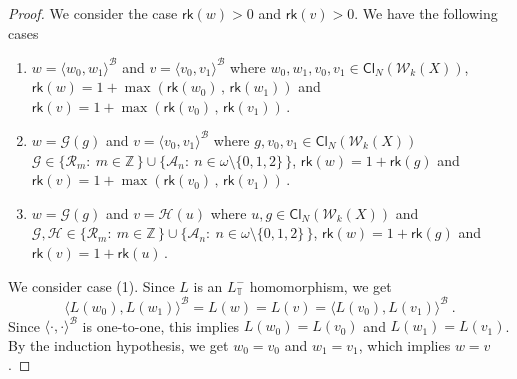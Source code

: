 \documentclass[10pt,a4paper]{amsart}
\begin{document}
\begin{proof}
We consider the case    $   \mathsf{rk}  \left( w  \right)    > 0  $  and     $    \mathsf{rk}  \left( v  \right)    >  0  $. 
We    have the following cases
\begin{enumerate}
\item    $  w  =  \langle  w_0 ,  w_1  \rangle^{  \mathcal{B}  }  $  and  $  v =  \langle  v_0, v_1  \rangle^{  \mathcal{B}  }  $
where  $ w_0, w_1,  v_0, v_1  \in     \mathsf{Cl}_{N}  \left(  \mathcal{W}_{k}  \left( X  \right)   \right)     $, 
 $  \mathsf{rk} \left(  w  \right)  =  1  +  \max\left(   \mathsf{rk} \left(  w_0 \right)  \,  ,  \,    \mathsf{rk} \left(  w_1  \right)   \right)     $ 
and  $  \mathsf{rk} \left(  v  \right)  =  1  +  \max\left(   \mathsf{rk} \left(  v_0 \right)  \,  ,  \,    \mathsf{rk} \left(  v_1  \right)   \right)    \,   $. 
  



\item     $  w  =    \mathcal{G}  \left(  g  \right)  $  and  $  v =  \langle v_0, v_1  \rangle^{  \mathcal{B}  }  $
where  $ g,  v_0, v_1  \in     \mathsf{Cl}_{N}  \left(  \mathcal{W}_{k}  \left( X  \right)   \right)     $
  $  \mathcal{G}     \in  \lbrace  \mathcal{R}_m   :  \   m  \in  \mathbb{Z} \,   \rbrace   \cup 
 \lbrace  \mathcal{A}_n :  \   n  \in    \omega  \setminus \lbrace 0, 1 ,  2   \rbrace  \,   \rbrace      $, 
  $  \mathsf{rk} \left(  w  \right)  =  1  +  \mathsf{rk} \left(  g \right)    $
and  $  \mathsf{rk} \left(  v  \right)  =  1  +  \max\left(   \mathsf{rk} \left(  v_0 \right)  \,  ,  \,    \mathsf{rk} \left(  v_1  \right)   \right)    \,   $. 



\item   $  w  =    \mathcal{G}  \left(  g   \right)  $  and  $  v =  \mathcal{H}  \left(  u \right)   $
where  $ u,  g  \in     \mathsf{Cl}_{N}  \left(  \mathcal{W}_{k}  \left( X  \right)   \right)     $
and  $  \mathcal{G} ,   \mathcal{H}      \in  \lbrace  \mathcal{R}_m   :  \   m  \in  \mathbb{Z} \,   \rbrace   \cup 
 \lbrace  \mathcal{A}_n :  \   n  \in    \omega  \setminus \lbrace 0, 1 ,  2    \rbrace  \,   \rbrace      $, 
   $  \mathsf{rk} \left(  w  \right)  =  1  +  \mathsf{rk} \left(  g \right)    $
and    $  \mathsf{rk} \left(  v  \right)  =  1  +  \mathsf{rk} \left(  u \right)       \,   $.
\end{enumerate} 
 We consider case (1). 
Since  $  L $  is an $  L_{  \mathbb{T} }^-  $  homomorphism,  we get  
\[
 \langle  L(w_0) ,  L( w_1)  \rangle^{  \mathcal{B}  }  
 =   L(w)   =  L(v)   =  
  \langle  L(v_0) ,  L( v_1)  \rangle^{  \mathcal{B}  }  
\     .
\]
Since  $  \langle  \cdot  ,  \cdot   \rangle^{  \mathcal{B}  }   $  is one-to-one,  
this implies  $  L(w_0) = L(v_0) $  and  $  L(w_1) = L(v_1) $. 
By the induction hypothesis,   we get $  w_0 = v_0 $  and  $  w_1= v_1 $, 
which implies  $  w = v $. 


\end{proof}
\end{document}
